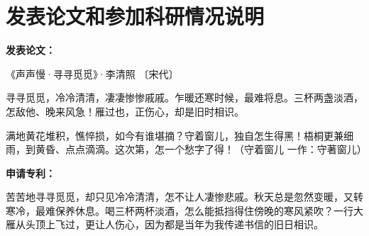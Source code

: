 \chapter*{发表论文和参加科研情况说明}
\thispagestyle{fancy}

\noindent
\textbf{发表论文：}

《声声慢·寻寻觅觅》·李清照 〔宋代〕

寻寻觅觅，冷冷清清，凄凄惨惨戚戚。乍暖还寒时候，最难将息。三杯两盏淡酒，怎敌他、晚来风急！雁过也，正伤心，却是旧时相识。

满地黄花堆积，憔悴损，如今有谁堪摘？守着窗儿，独自怎生得黑！梧桐更兼细雨，到黄昏、点点滴滴。这次第，怎一个愁字了得！（守着窗儿 一作：守著窗儿）

\noindent
\textbf{申请专利：}

苦苦地寻寻觅觅，却只见冷冷清清，怎不让人凄惨悲戚。秋天总是忽然变暖，又转寒冷，最难保养休息。喝三杯两杯淡酒，怎么能抵挡得住傍晚的寒风紧吹？一行大雁从头顶上飞过，更让人伤心，因为都是当年为我传递书信的旧日相识。